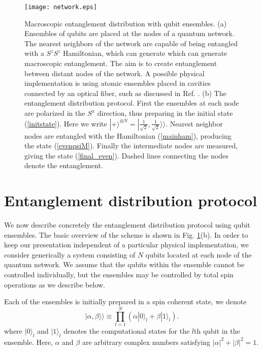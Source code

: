 \documentclass{WileyMSP-template}
\begin{document}
\begin{figure}[t]
\centering
\texttt{[image: network.eps]}
\caption{\label{fig1}
Macroscopic entanglement distribution with qubit ensembles.  (a) Ensembles of qubits are placed at the nodes of a quantum network.  The nearest neighbors of the network are capable of being entangled with a $ S^z S^z $ Hamiltonian, which can generate which can generate macroscopic entanglement.  The aim is to create entanglement between distant nodes of the network.  A possible physical implementation is using atomic ensembles placed in cavities connected by an optical fiber, such as discussed in Ref. \cite{pyrkov2013entanglement}.
(b) The entanglement distribution protocol.  First the ensembles at each node are polarized in the $ S^x $ direction, thus preparing in the initial state (\ref{initstate}).  Here we write $ | + \rangle^{\otimes N } = | \frac{1}{\sqrt{2}}, \frac{1}{\sqrt{2}}
\rangle \rangle $. Nearest neighbor nodes are entangled with the Hamiltonian (\ref{mainham}), producing the state (\ref{evenpsiM}).  Finally the intermediate nodes are measured, giving the state (\ref{final_even}). Dashed lines connecting the nodes denote the entanglement.    }
\end{figure}























\section{Entanglement distribution protocol}

We now describe concretely the entanglement distribution protocol using qubit ensembles. The basic overview of the scheme is shown in Fig. \ref{fig1}(b).  In order to keep our presentation independent of a particular physical implementation, we consider generically a system consisting of $ N $ qubits located at each node of the quantum network.  We assume that the qubits within the ensemble cannot be controlled individually, but the ensembles may be controlled by total spin operations as we describe below.

Each of the ensembles is initially prepared in a spin coherent state, we denote
%
\begin{equation}
\label{ensemblequbit}
|\alpha,\beta\rangle\rangle\equiv \prod_{l=1}^N (\alpha |0\rangle_l +\beta |1 \rangle_l).
\end{equation}
%
where $ |0\rangle_l $ and $ |1\rangle_l $ denotes the computational states for the $l$th qubit in the ensemble.  Here, $\alpha$ and $\beta$ are arbitrary complex numbers satisfying $|\alpha|^2+|\beta|^2=1$.
\end{document}
